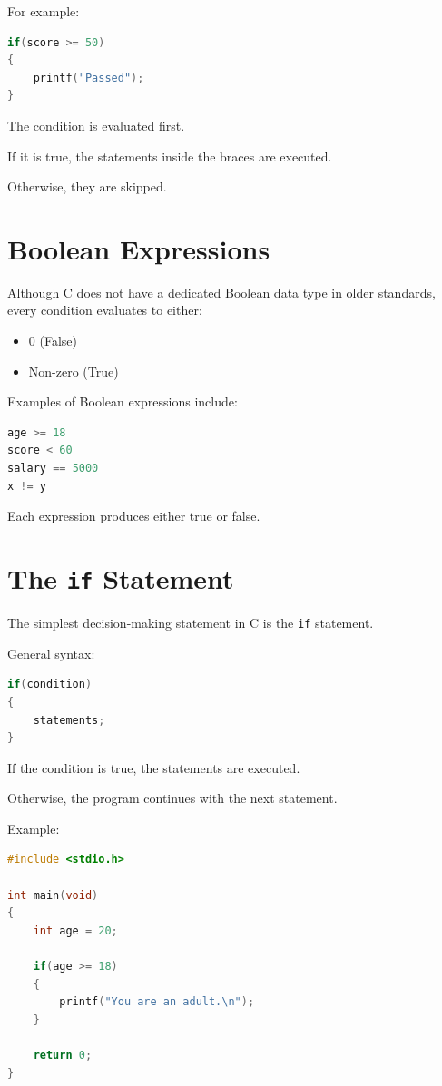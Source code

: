 \documentclass[12pt,openany]{book}
\begin{document}
For example:

\begin{lstlisting}[language=C]
if(score >= 50)
{
    printf("Passed");
}
\end{lstlisting}

The condition is evaluated first.

If it is true, the statements inside the braces are executed.

Otherwise, they are skipped.

\section{Boolean Expressions}

Although C does not have a dedicated Boolean data type in older standards, every condition evaluates to either:

\begin{itemize}
    \item 0 (False)
    \item Non-zero (True)
\end{itemize}

Examples of Boolean expressions include:

\begin{lstlisting}[language=C]
age >= 18
score < 60
salary == 5000
x != y
\end{lstlisting}

Each expression produces either true or false.
\section{The \texttt{if} Statement}

The simplest decision-making statement in C is the \texttt{if} statement.

General syntax:

\begin{lstlisting}[language=C]
if(condition)
{
    statements;
}
\end{lstlisting}

If the condition is true, the statements are executed.

Otherwise, the program continues with the next statement.

Example:

\begin{lstlisting}[language=C]
#include <stdio.h>

int main(void)
{
    int age = 20;

    if(age >= 18)
    {
        printf("You are an adult.\n");
    }

    return 0;
}
\end{lstlisting}
\end{document}
